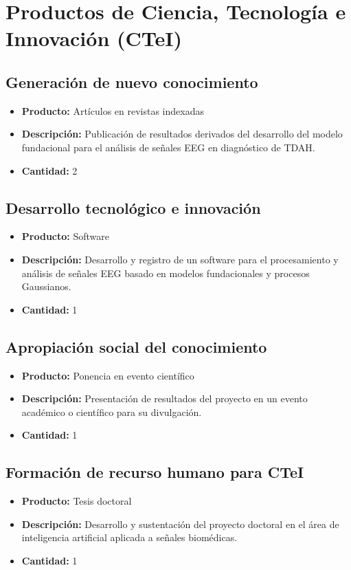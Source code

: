 \section{Productos de Ciencia, Tecnología e Innovación (CTeI)}

\subsection{Generación de nuevo conocimiento}
\begin{itemize}
    \item \textbf{Producto:} Artículos en revistas indexadas
    \item \textbf{Descripción:} Publicación de resultados derivados del desarrollo del modelo fundacional para el análisis de señales EEG en diagnóstico de TDAH.
    \item \textbf{Cantidad:} 2
\end{itemize}

\subsection{Desarrollo tecnológico e innovación}
\begin{itemize}
    \item \textbf{Producto:} Software
    \item \textbf{Descripción:} Desarrollo y registro de un software para el procesamiento y análisis de señales EEG basado en modelos fundacionales y procesos Gaussianos.
    \item \textbf{Cantidad:} 1
\end{itemize}

\subsection{Apropiación social del conocimiento}
\begin{itemize}
    \item \textbf{Producto:} Ponencia en evento científico
    \item \textbf{Descripción:} Presentación de resultados del proyecto en un evento académico o científico para su divulgación.
    \item \textbf{Cantidad:} 1
\end{itemize}

\subsection{Formación de recurso humano para CTeI}
\begin{itemize}
    \item \textbf{Producto:} Tesis doctoral
    \item \textbf{Descripción:} Desarrollo y sustentación del proyecto doctoral en el área de inteligencia artificial aplicada a señales biomédicas.
    \item \textbf{Cantidad:} 1
\end{itemize}